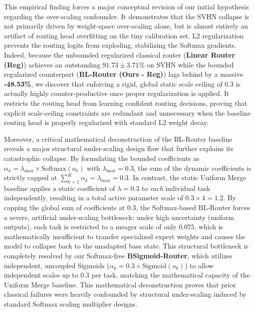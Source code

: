 \begin{enumerate}
    This empirical finding forces a major conceptual revision of our initial hypothesis regarding the over-scaling confounder. It demonstrates that the SVHN collapse is not primarily driven by weight-space over-scaling alone, but is almost entirely an artifact of routing head overfitting on the tiny calibration set. L2 regularization prevents the routing logits from exploding, stabilizing the Softmax gradients. Indeed, because the unbounded regularized classical router (\textbf{Linear Router (Reg)}) achieves an outstanding $91.73 \pm 3.71$\% on SVHN while the bounded regularized counterpart (\textbf{BL-Router (Ours - Reg)}) lags behind by a massive \textbf{-48.53\%}, we discover that enforcing a rigid, global static scale ceiling of 0.3 is actually highly counter-productive once proper regularization is applied. It restricts the routing head from learning confident routing decisions, proving that explicit scale-ceiling constraints are redundant and unnecessary when the baseline routing head is properly regularized with standard L2 weight decay.
    
    Moreover, a critical mathematical deconstruction of the BL-Router baseline reveals a major structural under-scaling design flaw that further explains its catastrophic collapse. By formulating the bounded coefficients as $\alpha_{k} = \lambda_{\max} \times \text{Softmax}(o_k)$ with $\lambda_{\max} = 0.3$, the sum of the dynamic coefficients is strictly capped at $\sum_{k=1}^K \alpha_{k} = \lambda_{\max} = 0.3$. In contrast, the static Uniform Merge baseline applies a static coefficient of $\lambda = 0.3$ to \textit{each} individual task independently, resulting in a total active parameter scale of $0.3 \times 4 = 1.2$. By capping the global sum of coefficients at $0.3$, the Softmax-based BL-Router forces a severe, artificial under-scaling bottleneck: under high uncertainty (uniform outputs), each task is restricted to a meager scale of only $0.075$, which is mathematically insufficient to transfer specialized expert weights and causes the model to collapse back to the unadapted base state. This structural bottleneck is completely resolved by our Softmax-free \textbf{BSigmoid-Router}, which utilizes independent, uncoupled Sigmoids ($\alpha_k = 0.3 \times \text{Sigmoid}(o_k)$) to allow independent scales up to $0.3$ per task, matching the mathematical capacity of the Uniform Merge baseline. This mathematical deconstruction proves that prior classical failures were heavily confounded by structural under-scaling induced by standard Softmax scaling multiplier designs.
    

\end{enumerate}
